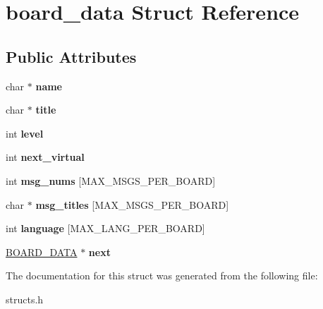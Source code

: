 \hypertarget{structboard__data}{\section{board\-\_\-data Struct Reference}
\label{structboard__data}
}
\subsection*{Public Attributes}
\begin{DoxyCompactItemize}
\item 
\hypertarget{structboard__data_acabd7c4b13eb5d67fffb95a585538d43}{char $\ast$ {\bfseries name}}\label{structboard__data_acabd7c4b13eb5d67fffb95a585538d43}

\item 
\hypertarget{structboard__data_ad4dcb58b875506d846b7b2f912bc7714}{char $\ast$ {\bfseries title}}\label{structboard__data_ad4dcb58b875506d846b7b2f912bc7714}

\item 
\hypertarget{structboard__data_ae35a14a68901068082fe1f310bf16a87}{int {\bfseries level}}\label{structboard__data_ae35a14a68901068082fe1f310bf16a87}

\item 
\hypertarget{structboard__data_afc9080edbaa8808d37f5e2aed71c2518}{int {\bfseries next\-\_\-virtual}}\label{structboard__data_afc9080edbaa8808d37f5e2aed71c2518}

\item 
\hypertarget{structboard__data_ac4159a0b117cd7527cc11903adeb44fb}{int {\bfseries msg\-\_\-nums} \mbox{[}M\-A\-X\-\_\-\-M\-S\-G\-S\-\_\-\-P\-E\-R\-\_\-\-B\-O\-A\-R\-D\mbox{]}}\label{structboard__data_ac4159a0b117cd7527cc11903adeb44fb}

\item 
\hypertarget{structboard__data_adf4dc87ed1aec8daadda29f29daa1835}{char $\ast$ {\bfseries msg\-\_\-titles} \mbox{[}M\-A\-X\-\_\-\-M\-S\-G\-S\-\_\-\-P\-E\-R\-\_\-\-B\-O\-A\-R\-D\mbox{]}}\label{structboard__data_adf4dc87ed1aec8daadda29f29daa1835}

\item 
\hypertarget{structboard__data_aa632c5301705fb2a6769e826929639fb}{int {\bfseries language} \mbox{[}M\-A\-X\-\_\-\-L\-A\-N\-G\-\_\-\-P\-E\-R\-\_\-\-B\-O\-A\-R\-D\mbox{]}}\label{structboard__data_aa632c5301705fb2a6769e826929639fb}

\item 
\hypertarget{structboard__data_a634ec853521e8005a4a26ed28c03d63c}{\hyperlink{structboard__data}{B\-O\-A\-R\-D\-\_\-\-D\-A\-T\-A} $\ast$ {\bfseries next}}\label{structboard__data_a634ec853521e8005a4a26ed28c03d63c}

\end{DoxyCompactItemize}


The documentation for this struct was generated from the following file\-:\begin{DoxyCompactItemize}
\item 
structs.\-h\end{DoxyCompactItemize}
